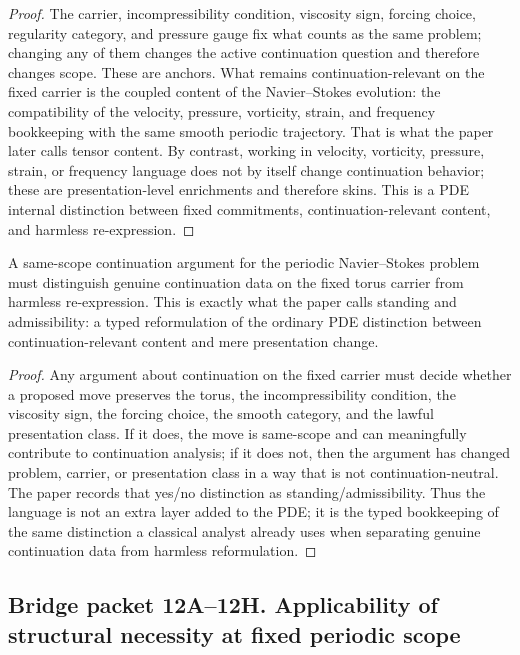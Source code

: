 \begin{proof}
The carrier, incompressibility condition, viscosity sign, forcing choice, regularity category, and
pressure gauge fix what counts as the same problem; changing any of them changes the active
continuation question and therefore changes scope.  These are anchors.  What remains
continuation-relevant on the fixed carrier is the coupled content of the Navier--Stokes evolution:
the compatibility of the velocity, pressure, vorticity, strain, and frequency bookkeeping with the
same smooth periodic trajectory.  That is what the paper later calls tensor content.  By contrast,
working in velocity, vorticity, pressure, strain, or frequency language does not by itself change
continuation behavior; these are presentation-level enrichments and therefore skins.  This is a PDE
internal distinction between fixed commitments, continuation-relevant content, and harmless
re-expression.
\end{proof}

\begin{proposition}
\label{prop:adequacy-admissibility-language}
A same-scope continuation argument for the periodic Navier--Stokes problem must distinguish genuine
continuation data on the fixed torus carrier from harmless re-expression.  This is exactly what the
paper calls standing and admissibility: a typed reformulation of the ordinary PDE distinction
between continuation-relevant content and mere presentation change.
\end{proposition}

\begin{proof}
Any argument about continuation on the fixed carrier must decide whether a proposed move preserves
the torus, the incompressibility condition, the viscosity sign, the forcing choice, the smooth
category, and the lawful presentation class.  If it does, the move is same-scope and can meaningfully
contribute to continuation analysis; if it does not, then the argument has changed problem, carrier,
or presentation class in a way that is not continuation-neutral.  The paper records that yes/no
distinction as standing/admissibility.  Thus the language is not an extra layer added to the PDE; it
is the typed bookkeeping of the same distinction a classical analyst already uses when separating
genuine continuation data from harmless reformulation.
\end{proof}


\subsection*{Bridge packet 12A--12H. Applicability of structural necessity at fixed periodic scope}
\label{subsec:bridge-packet-periodic}

